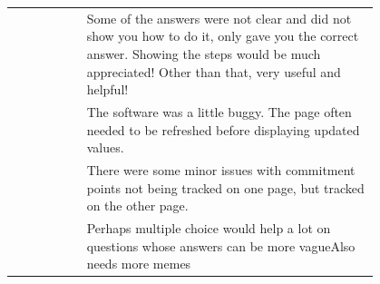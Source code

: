 \begin{longtable}{r|p{0.8\linewidth}}
		& Some of the answers were not clear and did not show you how to do it, only gave you the correct answer. Showing the steps would be much appreciated! Other than that, very useful and helpful!                                                                                                                                                                                                                                                                                                                                                                                                                                                                                                                                                   \\
		& The software was a little buggy. The page often needed to be refreshed before displaying updated values.                                                                                                                                                                                                                                                                                                                                                                                                                                                                                                                                                                                                                                         \\
		& There were some minor issues with commitment points not being tracked on one page, but tracked on the other page.                                                                                                                                                                                                                                                                                                                                                                                                                                                                                                                                                                                                                                \\
		& Perhaps multiple choice would help a lot on questions whose answers can be more vagueAlso needs more memes                                                                                                                                                                                                                                                                                                                                                                                                                                                                                                                                                                                                                                       \\

\end{longtable}
